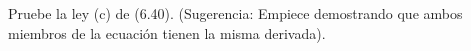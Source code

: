 \item Pruebe la ley (c) de (6.40). (Sugerencia: Empiece demostrando que ambos miembros de la ecuación tienen la misma derivada).
